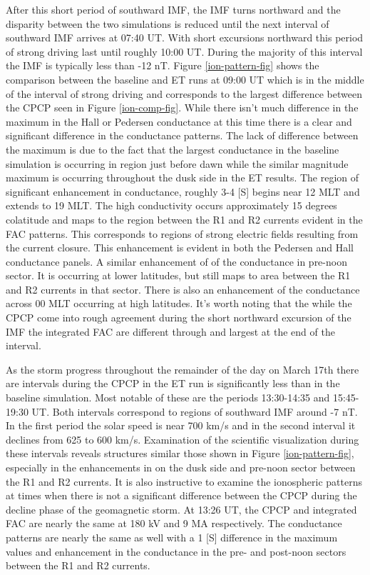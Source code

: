 \documentclass[draft,jgrga]{agutex}
\begin{document}
\begin{article}
After this short period of southward IMF, the IMF turns northward and the disparity between the two simulations is reduced until the next interval of southward IMF arrives at 07:40 UT.  With short excursions northward this period of strong driving last until roughly 10:00 UT.  During the majority of this interval the IMF is typically less than -12 nT.  Figure \ref{ion-pattern-fig} shows the comparison between the baseline and ET runs at 09:00 UT which is in the middle of the interval of strong driving and corresponds to the largest difference between the CPCP seen in Figure \ref{ion-comp-fig}.  While there isn't much difference in the maximum in the Hall or Pedersen conductance at this time there is a clear and significant difference in the conductance patterns.  The lack of difference between the maximum is due to the fact that the largest conductance in the baseline simulation is occurring in region just before dawn while the similar magnitude maximum is occurring throughout the dusk side in  the ET results.   The region of significant enhancement in conductance, roughly 3-4 [S] begins near 12 MLT and extends to 19 MLT.  The high conductivity occurs approximately 15 degrees colatitude and maps to the region between the R1 and R2 currents evident in the FAC patterns.  This corresponds to regions of strong electric fields resulting from the current closure.  This enhancement is evident in both the Pedersen and Hall conductance panels.  A similar enhancement of of the conductance in pre-noon sector.  It is occurring at lower latitudes, but still maps to area between the R1 and R2 currents in that sector.  There is also an enhancement of the conductance across 00 MLT occurring at high latitudes.  It's worth noting that the while the CPCP come into rough agreement during the short northward excursion of the IMF the integrated FAC are different through and largest at the end of the interval.  

As the storm progress throughout the remainder of the day on March 17th there are intervals during the CPCP in the ET run is significantly less than in the baseline simulation.  Most notable of these are the periods 13:30-14:35 and 15:45-19:30 UT.  Both intervals correspond to regions of southward IMF around -7 nT.  In the first period the solar speed is near 700 km/s and in the second interval it declines from 625 to 600 km/s.  Examination of the scientific visualization during these intervals reveals structures similar those shown in Figure \ref{ion-pattern-fig}, especially in the enhancements in on the dusk side and pre-noon sector between the R1 and R2 currents.  It is also instructive to examine the ionospheric patterns at times when there is not a significant difference between the CPCP during the decline phase of the geomagnetic storm.  At 13:26 UT, the CPCP and integrated FAC are  nearly the same at 180 kV and 9 MA respectively.  The conductance patterns are nearly the same as well with a 1 [S] difference in the maximum values and enhancement in the conductance in the pre- and post-noon sectors between the R1 and R2 currents.  


\end{article}
\end{document}
